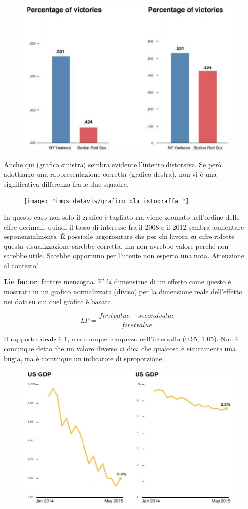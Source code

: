 \documentclass[12pt,a4paper]{report}
\begin{document}
\begin{figure} [h]
	\centering
	\includegraphics[width=0.4\linewidth]{"imgs datavis/colonne rosse e blu"}
	\caption{}
	\label{fig:colonne-rosse-e-blu}
\end{figure}


Anche qui (grafico sinistra) sembra evidente l'intento distorsivo. Se però adottiamo una rappresentazione corretta (grafico destra), non vi è una significativa differenza fra le due squadre. 

\begin{figure}[h]
	\centering
	\texttt{[image: "imgs datavis/grafico blu istograffa "]}
	\caption{}
	\label{fig:grafico-blu-istograffa-}
\end{figure}


In questo caso non solo il grafico è tagliato ma viene zoomato nell'ordine delle cifre decimali, quindi il tasso di interesse fra il 2008 e il 2012 sembra aumentare esponenzialmente. È possibile argomentare che per chi lavora su cifre ridotte questa visualizzazione sarebbe corretta, ma non avrebbe valore perché non sarebbe utile. Sarebbe opportuno per l’utente non esperto una nota. Attenzione al contesto!

\textbf{Lie factor}: fattore menzogna. E' la dimensione di un effetto come questo è mostrato in un grafico normalizzato (diviso) per la dimensione reale dell'effetto nei dati su cui quel grafico è basato 

\begin{equation}
	LF= \frac{first value - second value}{first value}
\end{equation}

Il rapporto ideale è 1, e comunque compreso nell’intervallo (0.95, 1.05). Non è comunque detto che un valore diverso ci dica che qualcosa è sicuramente una bugia, ma è comunque un indicatore di sproporzione. 

\begin{figure}[h]
	\centering
	\includegraphics[width=0.4\linewidth]{"imgs datavis/pil"}
	\caption{}
	\label{fig:pil}
\end{figure}
\end{document}
